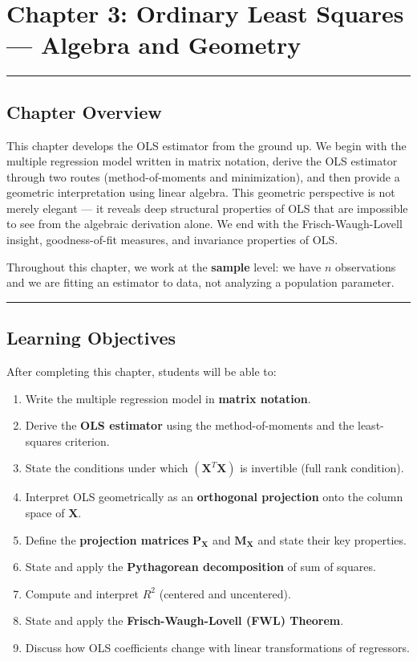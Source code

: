 \chapter{Chapter 3: Ordinary Least Squares --- Algebra and Geometry}

\medskip\hrule\medskip

\section{Chapter Overview}

This chapter develops the OLS estimator from the ground up. We begin with the multiple regression model written in matrix notation, derive the OLS estimator through two routes (method-of-moments and minimization), and then provide a geometric interpretation using linear algebra. This geometric perspective is not merely elegant --- it reveals deep structural properties of OLS that are impossible to see from the algebraic derivation alone. We end with the Frisch-Waugh-Lovell insight, goodness-of-fit measures, and invariance properties of OLS.

Throughout this chapter, we work at the \textbf{sample} level: we have $n$ observations and we are fitting an estimator to data, not analyzing a population parameter.

\medskip\hrule\medskip

\section{Learning Objectives}

After completing this chapter, students will be able to:

\begin{enumerate}
\item Write the multiple regression model in \textbf{matrix notation}.
\item Derive the \textbf{OLS estimator} using the method-of-moments and the least-squares criterion.
\item State the conditions under which $(\mathbf{X}^T\mathbf{X})$ is invertible (full rank condition).
\item Interpret OLS geometrically as an \textbf{orthogonal projection} onto the column space of $\mathbf{X}$.
\item Define the \textbf{projection matrices} $\mathbf{P_X}$ and $\mathbf{M_X}$ and state their key properties.
\item State and apply the \textbf{Pythagorean decomposition} of sum of squares.
\item Compute and interpret \textbf{$R^2$} (centered and uncentered).
\item State and apply the \textbf{Frisch-Waugh-Lovell (FWL) Theorem}.
\item Discuss how OLS coefficients change with linear transformations of regressors.
\end{enumerate}

